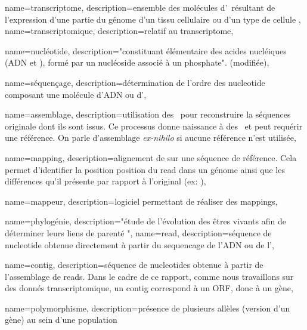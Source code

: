  {
    name=transcriptome,
    description={ensemble des molécules d'\ARN résultant de l'expression d'une partie du génome d'un tissu cellulaire ou d'un type de cellule \cite{LeDico}},
}
 {
    name=transcriptomique,
    description={relatif au \gls{transcriptome}},
}

 {
    name=nucléotide,
    description={"constituant élémentaire des acides nucléiques (ADN et \ARN), formé par un nucléoside associé à un phosphate". \cite{Robert} (modifiée)},
}


 {
    name=séquençage,
    description={détermination de l'ordre des \gls{nucleotide} composant une molécule d'ADN ou d'\ARN},
}

 {
    name=assemblage,
    description={utilisation des \reads pour reconstruire la séquences originale dont ils sont issus. Ce processus donne naissance à des \contigs et peut requérir une référence. On parle d'assemblage \textit{ex-nihilo} si aucune référence n'est utilisée},
}

 {
    name=mapping,
    description={alignement de \reads sur une séquence de référence. Cela permet d'identifier la position position du \gls{read} dans un génome ainsi que les différences qu'il présente par rapport à l'original (ex: \SNP)},
}

 {
    name=mappeur,
    description={logiciel permettant de réaliser des \glspl{mapping}},
}

 {
    name=phylogénie,
    description={"étude de l’évolution des êtres vivants afin de déterminer leurs liens de parenté \cite{LeDico}"},
}
 {
    name=read,
    description={séquence de \gls{nucleotide} obtenue directement à partir du \gls{sequencage} de l'ADN ou de l'\ARN},
}
\newcommand{\reads}{\glspl{read}}

 {
    name=contig,
    description={séquence de \glspl{nucleotide} obtenue à partir de l'\gls{assemblage} de \reads. Dans le cadre de ce rapport, comme nous travaillons sur des donnés \gls{transcriptomique}, un \gls{contig} correspond à un \acrfull{ORF}, donc à un gène},
}
\newcommand{\contig}{\gls{contig}}
\newcommand{\contigs}{\glspl{contig}}

 {
    name=polymorphisme,
    description={présence de plusieurs allèles (version d'un gène) au sein d'une population}
}


